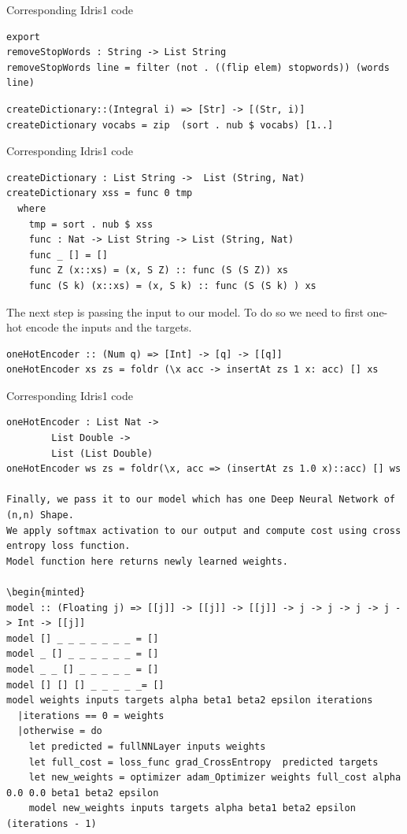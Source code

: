 \documentclass[]{report}
\begin{document}
Corresponding Idris1 code
\begin{verbatim}
export
removeStopWords : String -> List String
removeStopWords line = filter (not . ((flip elem) stopwords)) (words line)
\end{verbatim}

\begin{verbatim}
createDictionary::(Integral i) => [Str] -> [(Str, i)]
createDictionary vocabs = zip  (sort . nub $ vocabs) [1..]
\end{verbatim}

Corresponding Idris1 code
\begin{verbatim}
createDictionary : List String ->  List (String, Nat)
createDictionary xss = func 0 tmp 
  where
    tmp = sort . nub $ xss
    func : Nat -> List String -> List (String, Nat)
    func _ [] = []
    func Z (x::xs) = (x, S Z) :: func (S (S Z)) xs
    func (S k) (x::xs) = (x, S k) :: func (S (S k) ) xs

\end{verbatim}
The next step is passing the input to our model. To do so we need to first one-hot encode the inputs and the targets.

\begin{verbatim}
oneHotEncoder :: (Num q) => [Int] -> [q] -> [[q]]
oneHotEncoder xs zs = foldr (\x acc -> insertAt zs 1 x: acc) [] xs
\end{verbatim}
 
Corresponding Idris1 code
\begin{verbatim}
oneHotEncoder : List Nat -> 
		List Double -> 
		List (List Double)
oneHotEncoder ws zs = foldr(\x, acc => (insertAt zs 1.0 x)::acc) [] ws

Finally, we pass it to our model which has one Deep Neural Network of  (n,n) Shape. 
We apply softmax activation to our output and compute cost using cross entropy loss function. 
Model function here returns newly learned weights.

\begin{minted}
model :: (Floating j) => [[j]] -> [[j]] -> [[j]] -> j -> j -> j -> j -> Int -> [[j]]
model [] _ _ _ _ _ _ _ = []
model _ [] _ _ _ _ _ _ = []
model _ _ [] _ _ _ _ _ = []
model [] [] [] _ _ _ _ _= []
model weights inputs targets alpha beta1 beta2 epsilon iterations 
  |iterations == 0 = weights
  |otherwise = do
    let predicted = fullNNLayer inputs weights
    let full_cost = loss_func grad_CrossEntropy  predicted targets
    let new_weights = optimizer adam_Optimizer weights full_cost alpha 0.0 0.0 beta1 beta2 epsilon
    model new_weights inputs targets alpha beta1 beta2 epsilon (iterations - 1)
\end{verbatim}
\end{document}
